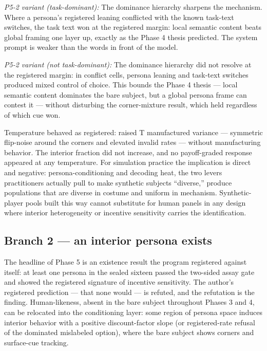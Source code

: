 \documentclass[11pt]{article}
\begin{document}
\emph{P5-2 variant (task-dominant):} The dominance hierarchy sharpens
the mechanism. Where a persona's registered leaning conflicted with the
known task-text switches, the task text won at the registered margin:
local semantic content beats global framing one layer up, exactly as the
Phase 4 thesis predicted. The system prompt is weaker than the words in
front of the model.

\emph{P5-2 variant (not task-dominant):} The dominance hierarchy did not
resolve at the registered margin: in conflict cells, persona leaning and
task-text switches produced mixed control of choice. This bounds the
Phase 4 thesis --- local semantic content dominates the bare subject,
but a global persona frame can contest it --- without disturbing the
corner-mixture result, which held regardless of which cue won.

Temperature behaved as registered: raised T manufactured variance ---
symmetric flip-noise around the corners and elevated invalid rates ---
without manufacturing behavior. The interior fraction did not increase,
and no payoff-graded response appeared at any temperature. For
simulation practice the implication is direct and negative:
persona-conditioning and decoding heat, the two levers practitioners
actually pull to make synthetic subjects ``diverse,'' produce
populations that are diverse in costume and uniform in mechanism.
Synthetic-player pools built this way cannot substitute for human panels
in any design where interior heterogeneity or incentive sensitivity
carries the identification.

\subsection{Branch 2 --- an interior persona
exists}\label{branch-2-an-interior-persona-exists}

The headline of Phase 5 is an existence result the program registered
against itself: at least one persona in the sealed sixteen passed the
two-sided assay gate and showed the registered signature of incentive
sensitivity. The author's registered prediction --- that none would ---
is refuted, and the refutation is the finding. Human-likeness, absent in
the bare subject throughout Phases 3 and 4, can be relocated into the
conditioning layer: some region of persona space induces interior
behavior with a positive discount-factor slope (or registered-rate
refusal of the dominated mislabeled option), where the bare subject
shows corners and surface-cue tracking.
\end{document}
